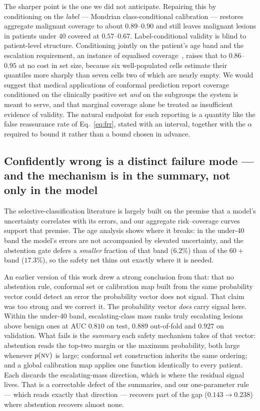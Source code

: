 \documentclass[journal]{IEEEtran}
\begin{document}
The sharper point is the one we did not anticipate. Repairing this by conditioning on the
\emph{label} --- Mondrian class-conditional calibration --- restores aggregate malignant
coverage to about $0.89$--$0.90$ and still leaves malignant lesions in patients under $40$
covered at $0.57$--$0.67$. Label-conditional validity is blind to patient-level structure.
Conditioning jointly on the patient's age band and the escalation requirement, an instance of
equalised coverage~\cite{romano2020equalized}, raises that to $0.86$--$0.95$ at no cost in set
size, because six well-populated cells estimate their quantiles more sharply than seven cells
two of which are nearly empty. We would suggest that medical applications of conformal
prediction report coverage conditioned on the clinically positive set \emph{and} on the
subgroups the system is meant to serve, and that marginal coverage alone be treated as
insufficient evidence of validity. The natural endpoint for such reporting is a quantity like
the false reassurance rate of Eq.~\eqref{eq:frr}, stated with an interval, together with the
$\alpha$ required to bound it rather than a bound chosen in advance.

\subsection{Confidently wrong is a distinct failure mode --- and the mechanism is in the
summary, not only in the model}
The selective-classification literature is largely built on the premise that a model's
uncertainty correlates with its errors, and our aggregate risk--coverage curves support that
premise. The age analysis shows where it breaks: in the under-$40$ band the model's errors are
not accompanied by elevated uncertainty, and the abstention gate defers a \emph{smaller}
fraction of that band ($6.2\%$) than of the $60+$ band ($17.3\%$), so the safety net thins out
exactly where it is needed.

An earlier version of this work drew a strong conclusion from that: that no abstention rule,
conformal set or calibration map built from the same probability vector could detect an error
the probability vector does not signal. That claim was too strong and we correct it. The
probability vector \emph{does} carry signal here. Within the under-$40$ band, escalating-class
mass ranks truly escalating lesions above benign ones at AUC $0.810$ on test, $0.889$
out-of-fold and $0.927$ on validation. What fails is the \emph{summary} each safety mechanism
takes of that vector: abstention reads the top-two margin or the maximum probability, both
large whenever $p(\textsc{nv})$ is large; conformal set construction inherits the same
ordering; and a global calibration map applies one function identically to every patient. Each
discards the escalating-mass direction, which is where the residual signal lives. That is a
correctable defect of the summaries, and our one-parameter rule --- which reads exactly that
direction --- recovers part of the gap ($0.143 \rightarrow 0.238$) where abstention recovers
almost none.
\end{document}

